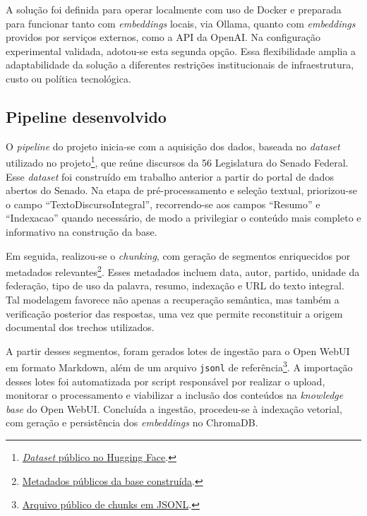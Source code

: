 A solução foi definida para operar localmente com uso de Docker e preparada para funcionar tanto com \textit{embeddings} locais, via Ollama, quanto com \textit{embeddings} providos por serviços externos, como a API da OpenAI. Na configuração experimental validada, adotou-se esta segunda opção. Essa flexibilidade amplia a adaptabilidade da solução a diferentes restrições institucionais de infraestrutura, custo ou política tecnológica.

\subsection{Pipeline desenvolvido}

O \textit{pipeline} do projeto inicia-se com a aquisição dos dados, baseada no \textit{dataset} utilizado no projeto\footnote{\href{https://huggingface.co/datasets/fabriciosantana/discursos-senado-legislatura-56}{\textit{Dataset} público no Hugging Face}.}, que reúne discursos da 56\textordfeminine{} Legislatura do Senado Federal. Esse \textit{dataset} foi construído em trabalho anterior a partir do portal de dados abertos do Senado. Na etapa de pré-processamento e seleção textual, priorizou-se o campo ``TextoDiscursoIntegral'', recorrendo-se aos campos ``Resumo'' e ``Indexacao'' quando necessário, de modo a privilegiar o conteúdo mais completo e informativo na construção da base.

Em seguida, realizou-se o \textit{chunking}, com geração de segmentos enriquecidos por metadados relevantes\footnote{\href{https://github.com/fabriciosantana/mcdia/blob/main/05-iag/4-project/knowledge_openwebui/build_metadata.json}{Metadados públicos da base construída}.}. Esses metadados incluem data, autor, partido, unidade da federação, tipo de uso da palavra, resumo, indexação e URL do texto integral. Tal modelagem favorece não apenas a recuperação semântica, mas também a verificação posterior das respostas, uma vez que permite reconstituir a origem documental dos trechos utilizados.

A partir desses segmentos, foram gerados lotes de ingestão para o Open WebUI em formato Markdown, além de um arquivo \texttt{jsonl} de referência\footnote{\href{https://github.com/fabriciosantana/mcdia/blob/main/05-iag/4-project/knowledge_openwebui/discursos_chunks.jsonl}{Arquivo público de chunks em JSONL}.}. A importação desses lotes foi automatizada por script responsável por realizar o upload, monitorar o processamento e viabilizar a inclusão dos conteúdos na \textit{knowledge base} do Open WebUI. Concluída a ingestão, procedeu-se à indexação vetorial, com geração e persistência dos \textit{embeddings} no ChromaDB.

